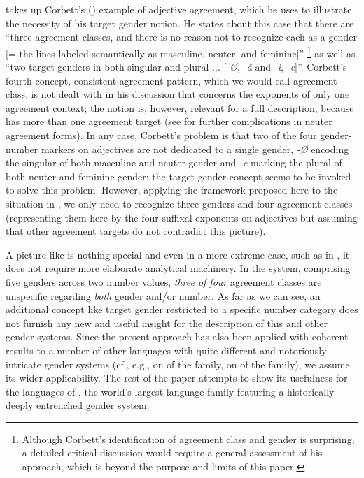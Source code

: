\documentclass[output=collectionpaper]{langsci/langscibook}
\begin{document}
 takes up Corbett's (\citeyear[150--152]{Corbett1991}) example of  adjective agreement, which he uses to illustrate the necessity of his target gender notion. He states about this case that there are ``three agreement classes, and there is no reason not to recognize each as a gender [= the lines labeled semantically as masculine, neuter, and feminine]''%
\footnote{Although Corbett's identification of agreement class and gender is surprising, a detailed critical discussion would require a general assessment of his approach, which is beyond the purpose and limits of this paper.%
} %
as well as ``two target genders in both singular and plural ... [\textit{{}-}\textit{Ø}, \textit{{}-}\textit{ă} and \textit{{}-i}, \textit{{}-e}]''. Corbett's fourth concept, consistent agreement pattern, which we would call agreement class, is not dealt with in his discussion that concerns the exponents of only one agreement context; the notion is, however, relevant for a full description, because  has more than one agreement target (see \citealt[213--214]{Corbett1991} for further complications in  neuter agreement forms). In any case, Corbett's problem is that two of the four gender-number markers on adjectives are not dedicated to a single gender, \textit{{}-}\textit{Ø} encoding the singular of both masculine and neuter gender and \textit{{}-e} marking the plural of both neuter and feminine gender; the target gender concept seems to be invoked to solve this problem. However, applying the framework proposed here to the situation in , we only need to recognize three genders and four agreement classes (representing them here by the four suffixal exponents on adjectives but assuming that other agreement targets do not contradict this picture).

A picture like  is nothing special and even in a more extreme case, such as  in , it does not require more elaborate analytical machinery. In the  system, comprising five genders across two number values, \emph{three of four} agreement classes are unspecific regarding \emph{both} gender and/or number. As far as we can see, an additional concept like target gender restricted to a specific number category does not furnish any new and useful insight for the description of this and other gender systems. Since the present approach has also been applied with coherent results to a number of other languages with quite different and notoriously intricate gender systems (cf., e.g., \citealt{Neuhaus2008} on  of the  family, \citealt{Gueldemann2015} on  of the  family), we assume its wider applicability. The rest of the paper attempts to show its usefulness for the languages of , the world's largest language family featuring a historically deeply entrenched gender system.
\end{document}
